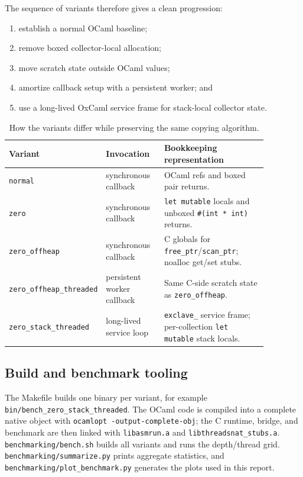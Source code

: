 \documentclass[11pt,a4paper]{article}
\begin{document}
The sequence of variants therefore gives a clean progression:
\begin{enumerate}
  \item establish a normal OCaml baseline;
  \item remove boxed collector-local allocation;
  \item move scratch state outside OCaml values;
  \item amortize callback setup with a persistent worker; and
  \item use a long-lived OxCaml service frame for stack-local collector state.
\end{enumerate}

\begin{table}[h]
\centering
\small
\begin{tabular}{@{}p{0.22\linewidth}p{0.23\linewidth}p{0.42\linewidth}@{}}
\toprule
\textbf{Variant} & \textbf{Invocation} & \textbf{Bookkeeping representation} \\
\midrule
\texttt{normal} & synchronous callback & OCaml refs and boxed pair returns. \\
\texttt{zero} & synchronous callback & \texttt{let mutable} locals and unboxed
\texttt{\#(int * int)} returns. \\
\texttt{zero\_offheap} & synchronous callback & C globals for
\texttt{free\_ptr}/\texttt{scan\_ptr}; noalloc get/set stubs. \\
\texttt{zero\_offheap\_threaded} & persistent worker callback & Same C-side
scratch state as \texttt{zero\_offheap}. \\
\texttt{zero\_stack\_threaded} & long-lived service loop & \texttt{exclave\_}
service frame; per-collection \texttt{let mutable} stack locals. \\
\bottomrule
\end{tabular}
\caption{How the variants differ while preserving the same copying algorithm.}
\label{tab:variants}
\end{table}

\subsection{Build and benchmark tooling}

The Makefile builds one binary per variant, for example
\texttt{bin/bench\_zero\_stack\_threaded}.  The OCaml code is compiled into a
complete native object with \texttt{ocamlopt -output-complete-obj}; the C
runtime, bridge, and benchmark are then linked with \texttt{libasmrun.a} and
\texttt{libthreadsnat\_stubs.a}.  \texttt{benchmarking/bench.sh} builds all
variants and runs the depth/thread grid.  \texttt{benchmarking/summarize.py}
prints aggregate statistics, and \texttt{benchmarking/plot\_benchmark.py}
generates the plots used in this report.
\end{document}
